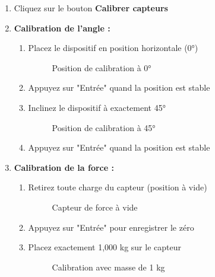 \documentclass[12pt,a4paper]{article}
\begin{document}
\begin{enumerate}
    \item Cliquez sur le bouton \textbf{Calibrer capteurs}
    
    \item \textbf{Calibration de l'angle :}
    \begin{enumerate}
        \item Placez le dispositif en position horizontale (0°)
        \begin{figure}[H]
            \centering
            \caption{Position de calibration à 0°}
            \label{fig:calib_0}
        \end{figure}
        
        \item Appuyez sur "Entrée" quand la position est stable
        \item Inclinez le dispositif à exactement 45°
        \begin{figure}[H]
            \centering
            \caption{Position de calibration à 45°}
            \label{fig:calib_45}
        \end{figure}
        
        \item Appuyez sur "Entrée" quand la position est stable
    \end{enumerate}
    
    \item \textbf{Calibration de la force :}
    \begin{enumerate}
        \item Retirez toute charge du capteur (position à vide)
        \begin{figure}[H]
            \centering
            \caption{Capteur de force à vide}
            \label{fig:calib_vide}
        \end{figure}
        
        \item Appuyez sur "Entrée" pour enregistrer le zéro
        \item Placez exactement 1,000 kg sur le capteur
        \begin{figure}[H]
            \centering
            \caption{Calibration avec masse de 1 kg}
            \label{fig:calib_1kg}
        \end{figure}
        

\end{enumerate}
\end{enumerate}
\end{document}
